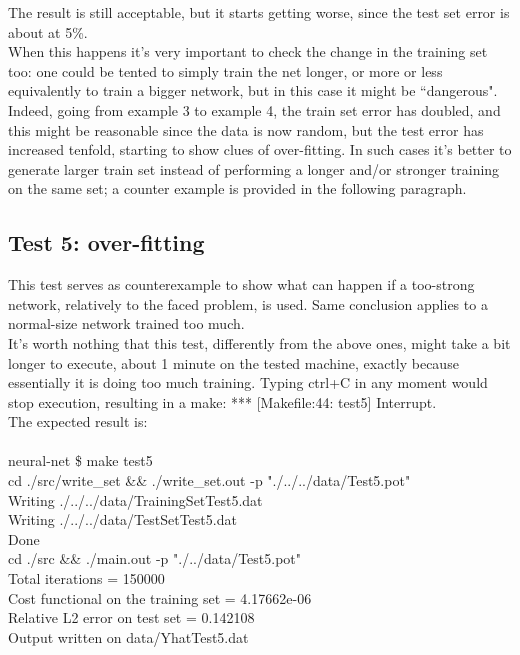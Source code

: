 \documentclass[12pt, a4paper]{report}
\theoremstyle{definition}
\begin{document}
\noindent The result is still acceptable, but it starts getting worse, since the test set error is about at 5\%. \\
When this happens it's very important to check the change in the training set too: one could be tented to simply train the net longer, or more or less equivalently to train a bigger network, but in this case it might be ``dangerous". Indeed, going from example 3 to example 4, the train set error has doubled, and this might be reasonable since the data is now random, but the test error has increased tenfold, starting to show clues of over-fitting. In such cases it's better to generate larger train set instead of performing a longer and/or stronger training on the same set; a counter example is provided in the following paragraph.
\subsection{Test 5: over-fitting}
This test serves as counterexample to show what can happen if a too-strong network, relatively to the faced problem, is used. Same conclusion applies to a normal-size network trained too much.\\
It's worth nothing that this test, differently from the above ones, might take a bit longer to execute, about 1 minute on the tested machine, exactly because essentially it is doing too much training. Typing {\ttfamily ctrl+C} in any moment would stop execution, resulting in a {\ttfamily make: *** [Makefile:44: test5] Interrupt}.\\
The expected result is:\\
{\\\ttfamily neural-net \$ make test5\\
	cd ./src/write\_set \&\& ./write\_set.out -p "./../../data/Test5.pot"\\
	Writing ./../../data/TrainingSetTest5.dat\\
	Writing ./../../data/TestSetTest5.dat\\
	Done\\
	cd ./src \&\& ./main.out -p "./../data/Test5.pot"\\
	Total iterations = 150000\\
	Cost functional on the training set = 4.17662e-06\\
	Relative L2 error on test set = 0.142108\\
	Output written on data/YhatTest5.dat\\
}
\end{document}
